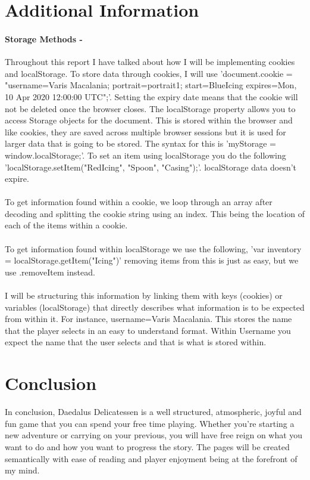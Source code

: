 \documentclass[10pt, a4paper]{article}
\begin{document}
    \section{Additional Information}
    \paragraph{Storage Methods - }Throughout this report I have talked about how I will be implementing cookies and localStorage. To store data through cookies, I will use 'document.cookie = "username=Varis Macalania; portrait=portrait1; start=BlueIcing expires=Mon, 10 Apr 2020 12:00:00 UTC";'. Setting the expiry date means that the cookie will not be deleted once the browser closes. The localStorage property allows you to access Storage objects for the document. This is stored within the browser and like cookies, they are saved across multiple browser sessions but it is used for larger data that is going to be stored. The syntax for this is 'myStorage = window.localStorage;'. To set an item using localStorage you do the following 'localStorage.setItem("RedIcing", "Spoon", "Casing");'. localStorage data doesn't expire. \\
    \\
    To get information found within a cookie, we loop through an array after decoding and splitting the cookie string using an index. This being the location of each of the items within a cookie. \\
    \\
    To get information found within localStorage we use the following, 'var inventory = localStorage.getItem("Icing")' removing items from this is just as easy, but we use .removeItem instead. \\
    \\
    I will be structuring this information by linking them with keys (cookies) or variables (localStorage) that directly describes what information is to be expected from within it. For instance, username=Varis Macalania. This stores the name that the player selects in an easy to understand format. Within Username you expect the name that the user selects and that is what is stored within. 
    
    \section{Conclusion}
    In conclusion, Daedalus Delicatessen is a well structured, atmospheric, joyful and fun game that you can spend your free time playing. Whether you're starting a new adventure or carrying on your previous, you will have free reign on what you want to do and how you want to progress the story. The pages will be created semantically with ease of reading and player enjoyment being at the forefront of my mind. 



		
\end{document}
